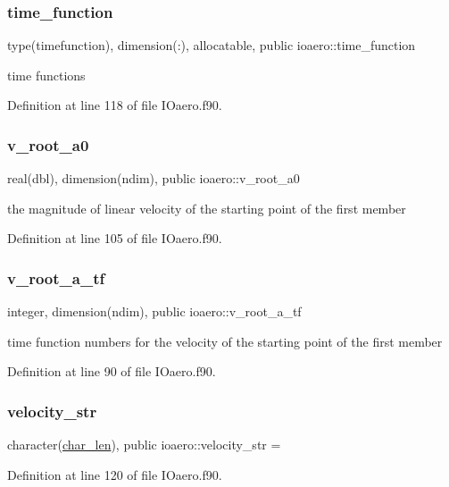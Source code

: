 \subsubsection{\texorpdfstring{time\+\_\+function}{time\_function}}
{\footnotesize\ttfamily type(timefunction), dimension(\+:), allocatable, public ioaero\+::time\+\_\+function}



time functions 



Definition at line 118 of file I\+Oaero.\+f90.

\mbox{\label{namespaceioaero_a3cefdbd9d62bffe41f44b7f79f321f67}} 
\subsubsection{\texorpdfstring{v\+\_\+root\+\_\+a0}{v\_root\_a0}}
{\footnotesize\ttfamily real(dbl), dimension(ndim), public ioaero\+::v\+\_\+root\+\_\+a0}



the magnitude of linear velocity of the starting point of the first member 



Definition at line 105 of file I\+Oaero.\+f90.

\mbox{\label{namespaceioaero_adb4e11942a388b1bf1f13d10c79614bc}} 
\subsubsection{\texorpdfstring{v\+\_\+root\+\_\+a\+\_\+tf}{v\_root\_a\_tf}}
{\footnotesize\ttfamily integer, dimension(ndim), public ioaero\+::v\+\_\+root\+\_\+a\+\_\+tf}



time function numbers for the velocity of the starting point of the first member 



Definition at line 90 of file I\+Oaero.\+f90.

\mbox{\label{namespaceioaero_ac653c5aea8d1de1b6255d0f47b6722f6}} 
\subsubsection{\texorpdfstring{velocity\+\_\+str}{velocity\_str}}
{\footnotesize\ttfamily character(\hyperlink{namespaceioaero_acd6bdfdcfd986fd1c26261e5996e3b03}{char\+\_\+len}), public ioaero\+::velocity\+\_\+str = \textquotesingle{}\textquotesingle{}}



Definition at line 120 of file I\+Oaero.\+f90.

